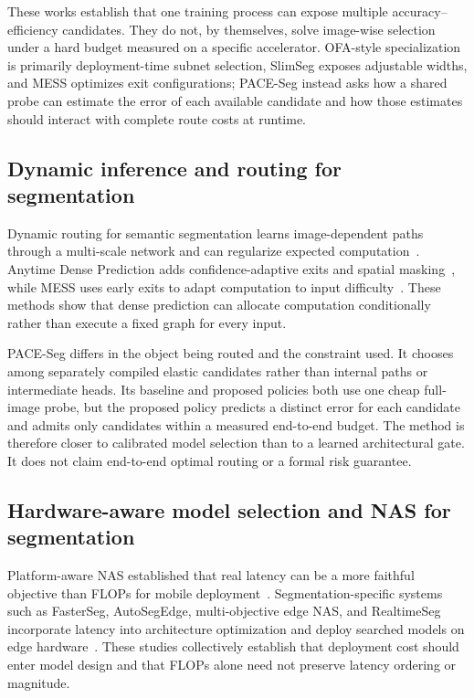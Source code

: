 \documentclass[a4paper,review,12pt]{elsarticle}
\newcommand{\method}{PACE-Seg}
\begin{document}
These works establish that one training process can expose multiple accuracy--efficiency candidates. They do not, by themselves, solve image-wise selection under a hard budget measured on a specific accelerator. OFA-style specialization is primarily deployment-time subnet selection, SlimSeg exposes adjustable widths, and MESS optimizes exit configurations; \method{} instead asks how a shared probe can estimate the error of each available candidate and how those estimates should interact with complete route costs at runtime.

\subsection{Dynamic inference and routing for segmentation}

Dynamic routing for semantic segmentation learns image-dependent paths through a multi-scale network and can regularize expected computation~\cite{li2020dynamic}. Anytime Dense Prediction adds confidence-adaptive exits and spatial masking~\cite{liu2022anytime}, while MESS uses early exits to adapt computation to input difficulty~\cite{kouris2022mess}. These methods show that dense prediction can allocate computation conditionally rather than execute a fixed graph for every input.

\method{} differs in the object being routed and the constraint used. It chooses among separately compiled elastic candidates rather than internal paths or intermediate heads. Its baseline and proposed policies both use one cheap full-image probe, but the proposed policy predicts a distinct error for each candidate and admits only candidates within a measured end-to-end budget. The method is therefore closer to calibrated model selection than to a learned architectural gate. It does not claim end-to-end optimal routing or a formal risk guarantee.

\subsection{Hardware-aware model selection and NAS for segmentation}

Platform-aware NAS established that real latency can be a more faithful objective than FLOPs for mobile deployment~\cite{tan2019mnasnet}. Segmentation-specific systems such as FasterSeg, AutoSegEdge, multi-objective edge NAS, and RealtimeSeg incorporate latency into architecture optimization and deploy searched models on edge hardware~\cite{chen2020fasterseg,dou2023autosegedge,dou2024multiobjective,li2023realtimeseg}. These studies collectively establish that deployment cost should enter model design and that FLOPs alone need not preserve latency ordering or magnitude.
\end{document}
